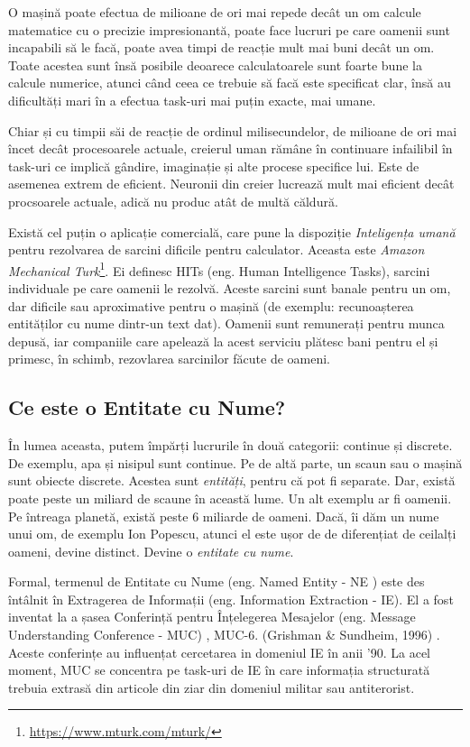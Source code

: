 O mașină poate efectua de milioane de ori mai repede decât un om calcule matematice cu o precizie impresionantă, poate face lucruri pe care oamenii sunt incapabili să le facă, poate avea timpi de reacție mult mai buni decât un om. Toate acestea sunt însă posibile deoarece calculatoarele sunt foarte bune la calcule numerice, atunci când ceea ce trebuie să facă este specificat clar, însă au dificultăți mari în a efectua task-uri mai puțin exacte, mai umane.

Chiar și cu timpii săi de reacție de ordinul milisecundelor, de milioane de ori mai încet decât procesoarele actuale, creierul uman rămâne în continuare infailibil în task-uri ce implică gândire, imaginație și alte procese specifice lui. Este de asemenea extrem de eficient. Neuronii din creier lucrează mult mai eficient decât procsoarele actuale, adică nu produc atât de multă căldură.

Există cel puțin o aplicație comercială, care pune la dispoziție \textit{Inteligența umană} pentru rezolvarea de sarcini dificile pentru calculator. Aceasta este \textit{Amazon Mechanical Turk}\footnote{\url{https://www.mturk.com/mturk/}}. Ei definesc HITs (eng. Human Intelligence Tasks), sarcini individuale pe care oamenii le rezolvă. Aceste sarcini sunt banale pentru un om, dar dificile sau aproximative pentru o mașină (de exemplu: recunoașterea entităților cu nume dintr-un text dat). Oamenii sunt remunerați pentru munca depusă, iar companiile care apelează la acest serviciu plătesc bani pentru el și primesc, în schimb, rezovlarea sarcinilor făcute de oameni.

\subsection{Ce este o Entitate cu Nume?}

În lumea aceasta, putem împărți lucrurile în două categorii: continue și discrete. De exemplu, apa și nisipul sunt continue. Pe de altă parte, un scaun sau o mașină sunt obiecte discrete. Acestea sunt \textit{entități}, pentru că pot fi separate. Dar, există poate peste un miliard de scaune în această lume. Un alt exemplu ar fi oamenii. Pe întreaga planetă, există peste 6 miliarde de oameni. Dacă, îi dăm un nume unui om, de exemplu Ion Popescu, atunci el este ușor de de diferențiat de ceilalți oameni, devine distinct. Devine o \textit{entitate cu nume}.

 
Formal, termenul de Entitate cu Nume (eng. Named Entity - NE )  este des întâlnit în Extragerea de Informații (eng. Information Extraction - IE). El a fost inventat la a șasea Conferință pentru Înțelegerea Mesajelor (eng. Message Understanding Conference - MUC)
, MUC-6. (Grishman \& Sundheim, 1996) \cite{grishman1996}. Aceste conferințe au influențat cercetarea in domeniul IE în anii '90. La acel moment, MUC se concentra pe task-uri de IE în care informația structurată trebuia extrasă din articole din ziar din domeniul militar sau antiterorist.

